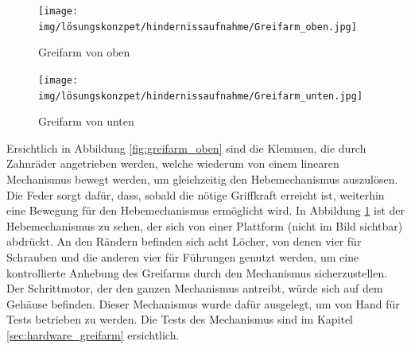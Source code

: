 \documentclass[../main.tex]{subfiles}
\begin{document}
\begin{figure}[h!]
    \centering
    \begin{minipage}[t]{0.45\textwidth}
        \centering
        \texttt{[image: img/lösungskonzpet/hindernissaufnahme/Greifarm\_oben.jpg]}
        \caption{Greifarm von oben}
        \label{fig:greifarm_oben}
    \end{minipage}
    \hfill
    \begin{minipage}[t]{0.45\textwidth}
        \centering
        \texttt{[image: img/lösungskonzpet/hindernissaufnahme/Greifarm\_unten.jpg]}
        \caption{Greifarm von unten}
        \label{fig:greifarm_unten}
    \end{minipage}
\end{figure}

Ersichtlich in Abbildung \ref{fig:greifarm_oben} sind die Klemmen, die durch Zahnräder angetrieben werden, welche wiederum von einem linearen Mechanismus bewegt werden, um gleichzeitig den Hebemechanismus auszulösen. Die Feder sorgt dafür, dass, sobald die nötige Griffkraft erreicht ist, weiterhin eine Bewegung für den Hebemechanismus ermöglicht wird. In Abbildung \ref{fig:greifarm_unten} ist der Hebemechanismus zu sehen, der sich von einer Plattform (nicht im Bild sichtbar) abdrückt. An den Rändern befinden sich acht Löcher, von denen vier für Schrauben und die anderen vier für Führungen genutzt werden, um eine kontrollierte Anhebung des Greifarms durch den Mechanismus sicherzustellen.
Der Schrittmotor, der den ganzen Mechanismus antreibt, würde sich auf dem Gehäuse befinden. Dieser Mechanismus wurde dafür ausgelegt, um von Hand für Tests betrieben zu werden. Die Tests des Mechanismus sind im Kapitel \ref{sec:hardware_greifarm} ersichtlich.
\end{document}
